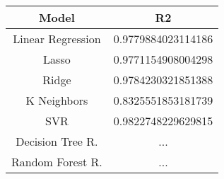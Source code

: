 \documentclass[../../Report.tex]{subfiles}
\begin{document}
\begin{table}[H]
    \centering
    \begin{tabular}{|c|c|}
        \hline
        \textbf{Model}   & \textbf{R2}  \\
        \hline
        Linear Regression   &  0.9779884023114186    \\
        Lasso               & 0.9771154908004298     \\
        Ridge               & 0.9784230321851388     \\
        K Neighbors         & 0.8325551853181739     \\
        SVR                 & 0.9822748229629815    \\
        Decision Tree R.    & ...         \\
        Random Forest R.    & ...              \\
        \hline
    \end{tabular}
    
    \label{tab:classic_ml_results_2}
\end{table}
\end{document}
